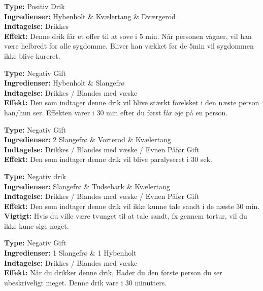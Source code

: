 \begin{drik*}
\textbf{Type:} Positiv Drik\\
\textbf{Ingredienser:} Hybenholt \& Kvælertang \& Dværgerod\\
\textbf{Indtagelse:} Drikkes\\
\textbf{Effekt:} Denne drik får et offer til at sove i 5 min. Når personen vågner, vil han være helbredt for alle sygdomme. Bliver han vækket før de 5min vil sygdommen ikke blive kureret.\\
\end{drik*}

\begin{gift*}[Kærlighedsdrik]
\textbf{Type:} Negativ Gift\\
\textbf{Ingredienser:} Hybenholt \& Slangefrø\\
\textbf{Indtagelse:} Drikkes / Blandes med væske\\
\textbf{Effekt:} Den som indtager denne drik vil blive stærkt forelsket i den næste person han/hun ser. Effekten varer i 30 min efter du først får øje på en person.\\
\end{gift*}

\begin{gift*}[Paralysedrik]
\textbf{Type:} Negativ Gift\\
\textbf{Ingredienser:} 2 Slangefrø \& Vorterod \& Kvælertang\\
\textbf{Indtagelse:} Drikkes / Blandes med væske / Evnen Påfør Gift\\
\textbf{Effekt:} Den som indtager denne drik vil blive paralyseret i 30 sek.\\
\end{gift*}

\begin{gift*}
\textbf{Type:} Negativ drik\\
\textbf{Ingredienser:} Slangefrø \& Tudsebark \& Kvælertang\\
\textbf{Indtagelse:} Drikkes / Blandes med væske / Evnen Påfør Gift\\
\textbf{Effekt:} Den som indtager denne drik vil ikke kunne tale sandt i de næste 30 min.\\
\textbf{Vigtigt:} Hvis du ville være tvunget til at tale sandt, fx gennem tortur, vil du ikke kune sige noget.
\end{gift*}

\begin{gift*}
\textbf{Type:} Negativ Gift\\
\textbf{Ingredienser:} 1 Slangefrø \& 1 Hybenholt \\
\textbf{Indtagelse:} Drikkes / Blandes med væske\\
\textbf{Effekt:} Når du drikker denne drik, Hader du den første person du ser ubeskriveligt meget. Denne drik vare i 30 minutters.
\end{gift*}

